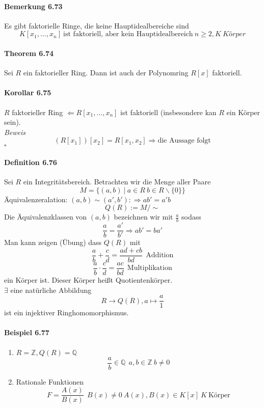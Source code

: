 \documentclass{scrartcl}
\begin{document}
\paragraph{Bemerkung 6.73}
Es gibt faktorielle Ringe, die keine Hauptidealbereiche sind
\[
  K[x_1, \dots, x_n] ~\text{ist faktoriell, aber kein Hauptidealbereich}~
  n \geq 2, K ~ Körper
\]

\paragraph{Theorem 6.74}
Sei $R$ ein faktorieller Ring. Dann ist auch der Polynomring $R[x]$ faktoriell.

\paragraph{Korollar 6.75}
$R$ faktorieller Ring $\Leftarrow R[x_1, \dots, x_n]$ ist faktoriell
(insbesondere kan $R$ ein Körper sein). \\
\textit{Beweis} \\
\[
  (R[x_1])[x_2] = R[x_1,x_2] \Rightarrow \text{die Aussage folgt}
\]
\hfill $\square$

\paragraph{Definition 6.76}
Sei $R$ ein Integritätsbereich. Betrachten wir die Menge aller Paare
\[
  M = \{(a,b) ~|~ a \in R ~ b \in R\backslash \{0\} \}
\]
Äquivalenzeralation: $(a,b) \sim (a', b') :\Rightarrow ab' = a'b$
\[
  Q(R) := M/\sim
\]
Die Äquivalenzklassen von $(a, b)$ bezeichnen wir mit $\frac{a}{b}$ sodass
\[
  \frac{a}{b} = \frac{a'}{b'} \Rightarrow ab' = ba'
\]
Man kann zeigen (Übung) dass $Q(R)$ mit
\[
  \frac{a}{b} + \frac{c}{d} = \frac{ad + cb}{bd} ~~\text{Addition}
\]
\[
  \frac{a}{b} \cdot \frac{c}{d} = \frac{ac}{bd} ~~\text{Multiplikation}
\]
ein Körper ist. Dieser Körper heißt Quotientenkörper. \\
$\exists$ eine natürliche Abbildung
\[
  R \to Q(R), a \mapsto \frac{a}{1}
\]
ist ein injektiver Ringhomomorphismus.

\paragraph{Beispiel 6.77}
\begin{enumerate}
\item $R = \mathbb{Z}, Q(R) = \mathbb{Q}$
  \[
    \frac{a}{b} \in \mathbb{Q} ~~ a,b \in \mathbb{Z} ~ b \neq 0
  \]
\item Rationale Funktionen
  \[
    F = \frac{A(x)}{B(x)} ~~ B(x) \neq 0 ~ A(x),B(x) \in K[x] ~ K ~\text{Körper}
  \]
\end{enumerate}
\end{document}
